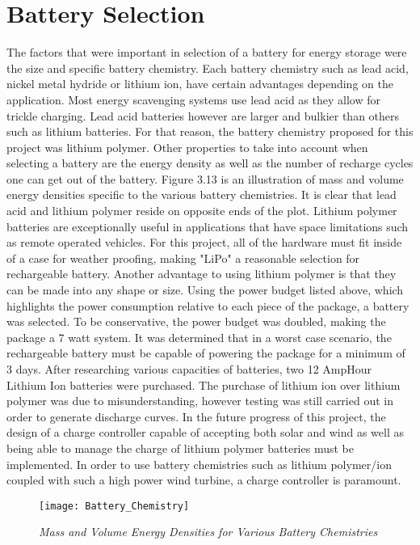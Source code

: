 
\section{Battery Selection}
\indent The factors that were important in selection of a battery for energy storage were the size and specific battery chemistry. 
Each battery chemistry such as lead acid, nickel metal hydride or lithium ion, have certain advantages depending on the application. 
Most energy scavenging systems use lead acid as they allow for trickle charging. 
Lead acid batteries  however are larger and bulkier than others such as lithium batteries. 
For that reason, the battery chemistry proposed for this project was lithium polymer.
Other properties to take into account when selecting a battery are the energy density as well as the number of recharge cycles one can get out of the battery. 
Figure 3.13 is an illustration of mass and volume energy densities specific to the various battery chemistries. It is clear that lead acid and lithium polymer reside on opposite ends of the plot. 
\indent Lithium polymer batteries are exceptionally useful in applications that have space limitations such as remote operated vehicles. For this project, all of the hardware must fit inside of a case for weather proofing, making "LiPo" a reasonable selection for rechargeable battery. 
Another advantage to using lithium polymer is that they can be made into any shape or size. 
\indent Using the power budget listed above, which highlights the power consumption relative to each piece of the package, a battery was selected. To be conservative, the power budget was doubled, making the package a 7 watt system. It was determined that in a worst case scenario, the rechargeable battery must be capable of powering the package for a minimum of 3 days. After researching various capacities of batteries, two 12 AmpHour Lithium Ion batteries were purchased. The purchase of lithium ion over lithium polymer was due to misunderstanding, however testing was still carried out in order to generate discharge curves. In the future progress of this project, the design of a charge controller capable of accepting both solar and wind as well as being able to manage the charge of lithium polymer batteries must be implemented. In order to use battery chemistries such as lithium polymer/ion coupled with such a high power wind turbine, a charge controller is paramount. 

\begin{figure}
\centering
\texttt{[image: Battery\_Chemistry]}
\caption{\textit{Mass and Volume Energy Densities for Various Battery Chemistries}}
\label{fig:Battery_Chemistry}
\end{figure}
